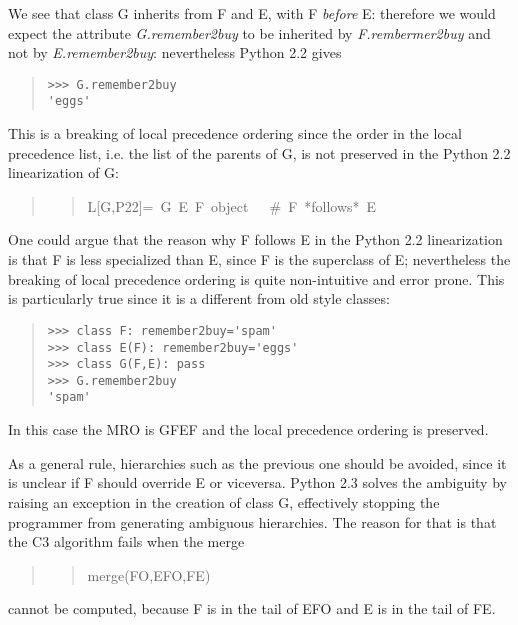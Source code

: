 \documentclass[10pt,a4paper,english]{article}
\begin{document}
We see that class G inherits from F and E, with F \emph{before} E:  therefore
we would expect the attribute \emph{G.remember2buy} to be inherited by
\emph{F.rembermer2buy} and not by \emph{E.remember2buy}:  nevertheless Python 2.2
gives
\begin{quote}
\begin{verbatim}>>> G.remember2buy
'eggs'\end{verbatim}
\end{quote}

This is a breaking of local precedence ordering since the order in the
local precedence list, i.e. the list of the parents of G, is not
preserved in the Python 2.2 linearization of G:
\begin{quote}
\begin{quote}{\ttfamily \raggedright \noindent
L{[}G,P22]=~G~E~F~object~~~{\#}~F~*follows*~E
}\end{quote}
\end{quote}

One could argue that the reason why F follows E in the Python 2.2
linearization is that F is less specialized than E, since F is the
superclass of E; nevertheless the breaking of local precedence ordering
is quite non-intuitive and error prone.  This is particularly true since
it is a different from old style classes:
\begin{quote}
\begin{verbatim}>>> class F: remember2buy='spam'
>>> class E(F): remember2buy='eggs'
>>> class G(F,E): pass
>>> G.remember2buy
'spam'\end{verbatim}
\end{quote}

In this case the MRO is GFEF and the local precedence ordering is
preserved.

As a general rule, hierarchies such as the previous one should be
avoided, since it is unclear if F should override E or viceversa.
Python 2.3 solves the ambiguity by raising an exception in the creation
of class G, effectively stopping the programmer from generating
ambiguous hierarchies.  The reason for that is that the C3 algorithm
fails when the merge
\begin{quote}
\begin{quote}{\ttfamily \raggedright \noindent
merge(FO,EFO,FE)
}\end{quote}
\end{quote}

cannot be computed, because F is in the tail of EFO and E is in the tail
of FE.
\end{document}
